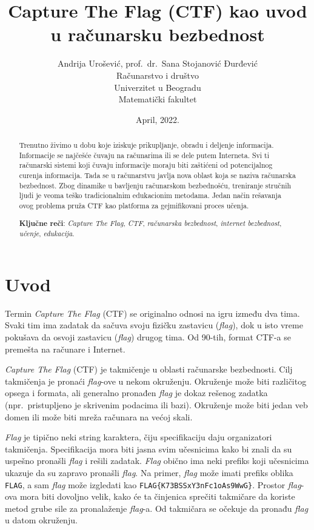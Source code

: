 \documentclass[12pt, a4paper, twocolumn]{article}
\title{Capture The Flag (CTF) kao uvod u računarsku bezbednost}
\author{Andrija Urošević, prof.\ dr.\ Sana Stojanović Đurđević\\Računarstvo i društvo\\Univerzitet u Beogradu\\Matematički fakultet}
\date{April, 2022.}
\begin{document}
\maketitle

\begin{abstract}
    Trenutno živimo u dobu koje iziskuje prikupljanje, obradu i deljenje 
    informacija. Informacije se najčešće čuvaju na računarima ili se dele
    putem Interneta. Svi ti računarski sistemi koji čuvaju informacije moraju
    biti zaštićeni od potencijalnog curenja informacija. Tada se u računarstvu
    javlja nova oblast koja se naziva računarska bezbednost. Zbog dinamike u 
    bavljenju računarskom bezbednošću, treniranje stručnih ljudi je veoma
    teško tradicionalnim edukacionim metodama. Jedan način rešavanja ovog 
    problema pruža CTF kao platforma za gejmifikovani proces učenja.

    \textbf{Ključne reči}: \emph{Capture The Flag}, \emph{CTF}, 
    \emph{računarska bezbednost}, \emph{internet bezbednost}, \emph{učenje}, 
    \emph{edukacija}.
\end{abstract}

\section{Uvod}

Termin \emph{Capture The Flag} (CTF) se originalno odnosi na igru između dva
tima. Svaki tim ima zadatak da sačuva svoju fizičku zastavicu (\emph{flag}), 
dok u isto vreme pokušava da osvoji zastavicu (\emph{flag}) drugog tima.
Od 90-tih, format CTF-a se premešta na računare i Internet. 

\emph{Capture The Flag} (CTF) je takmičenje u oblasti računarske bezbednosti.
Cilj takmičenja je pronaći \emph{flag}-ove u nekom okruženju. Okruženje može
biti različitog opsega i formata, ali generalno pronađen \emph{flag} je dokaz
rešenog zadatka (npr.\ pristupljeno je skrivenim podacima ili bazi). Okruženje 
može  biti jedan veb domen ili može biti mreža računara na većoj skali.

\emph{Flag} je tipično neki string karaktera, čiju specifikaciju daju
organizatori takmičenja. Specifikacija mora biti jasna svim učesnicima kako 
bi znali da su uspešno pronašli \emph{flag} i rešili zadatak. \emph{Flag}
obično ima neki prefiks koji učesnicima ukazuje da su zapravo pronašli 
\emph{flag}. Na primer, \emph{flag} može imati prefiks oblika \texttt{FLAG},
a sam \emph{flag} može izgledati kao \texttt{FLAG\{K73BSSxY3nFc1oAs9WwG\}}.
Prostor \emph{flag}-ova mora biti dovoljno velik, kako će ta činjenica 
sprečiti takmičare da koriste metod grube sile za pronalaženje \emph{flag}-a. 
Od takmičara se očekuje da pronađu \emph{flag} u datom okruženju.
\end{document}
